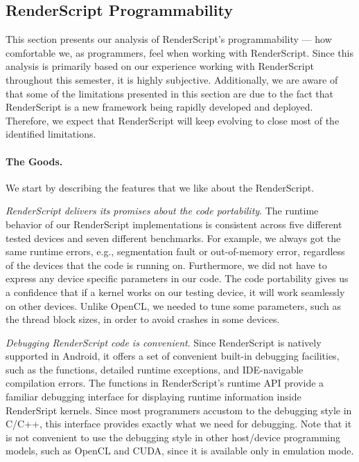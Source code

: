 \subsection{RenderScript Programmability}
This section presents our analysis of RenderScript's programmability --- how
comfortable we, as programmers, feel when working with RenderScript. Since this
analysis is primarily based on our experience working with RenderScript
throughout this semester, it is highly subjective. Additionally, we are aware of
that some of the limitations presented in this section are due to the fact that
RenderScript is a new framework being rapidly developed and deployed.
Therefore, we expect that RenderScript will keep evolving to close most of the
identified limitations.

\paragraph{The Goods.}
We start by describing the features that we like about the RenderScript.

\textit{RenderScript delivers its promises about the code portability}.
The runtime behavior of our RenderScript implementations is consistent across
five different tested devices and seven different benchmarks. For example, we
always got the same runtime errors, e.g., segmentation fault or out-of-memory
error, regardless of the devices that the code is running on. Furthermore, we
did not have to express any device specific parameters in our code. The code
portability gives us a confidence that if a kernel works on our testing device,
it will work seamlessly on other devices. Unlike OpenCL, we needed to tune some
parameters, such as the thread block sizes, in order to avoid crashes in some
devices.

\textit{Debugging RenderScript code is convenient}. Since RenderScript is
natively supported in Android, it offers a set of convenient built-in debugging
facilities, such as the  functions, detailed runtime exceptions,
and IDE-navigable compilation errors. The  functions in
RenderScript's runtime API provide a familiar debugging interface for displaying
runtime information inside RenderSript kernels. Since most programmers accustom
to the  debugging style in C/C++, this interface provides exactly
what we need for debugging. Note that it is not convenient to use the
 debugging style in other host/device programming models, such as
OpenCL and CUDA, since it is available only in emulation mode.


